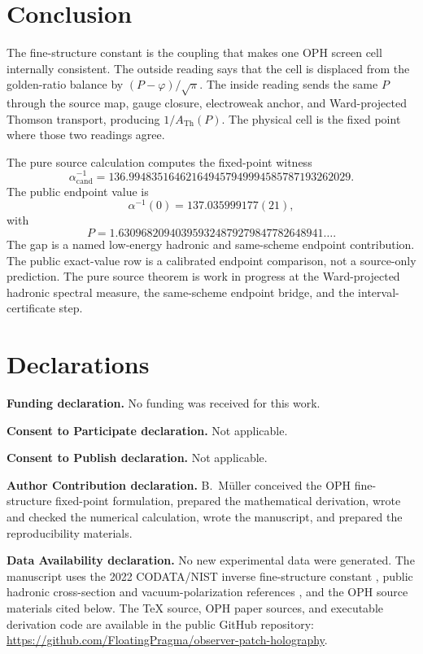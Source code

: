 \documentclass[11pt]{article}
\theoremstyle{remark}
\newcommand{\alphainv}{\alpha^{-1}}
\newcommand{\ATh}{A_{\mathrm{Th}}}
\begin{document}
\section{Conclusion}

The fine-structure constant is the coupling that makes one OPH screen cell internally consistent. The outside reading says that the cell is displaced from the golden-ratio balance by \((P-\varphi)/\sqrt\pi\). The inside reading sends the same \(P\) through the source map, gauge closure, electroweak anchor, and Ward-projected Thomson transport, producing \(1/\ATh(P)\). The physical cell is the fixed point where those two readings agree.

The pure source calculation computes the fixed-point witness
\[
\alphainv_{\mathrm{cand}}=136.994835164621649457949994585787193262029.
\]
The public endpoint value is
\[
\alphainv(0)=137.035999177(21),
\]
with
\[
P=1.630968209403959324879279847782648941\ldots.
\]
The gap is a named low-energy hadronic and same-scheme endpoint contribution. The public exact-value row is a calibrated endpoint comparison, not a source-only prediction. The pure source theorem is work in progress at the Ward-projected hadronic spectral measure, the same-scheme endpoint bridge, and the interval-certificate step.

\section*{Declarations}

\textbf{Funding declaration.} No funding was received for this work.

\textbf{Consent to Participate declaration.} Not applicable.

\textbf{Consent to Publish declaration.} Not applicable.

\textbf{Author Contribution declaration.} B.\ M\"uller conceived the OPH fine-structure fixed-point formulation, prepared the mathematical derivation, wrote and checked the numerical calculation, wrote the manuscript, and prepared the reproducibility materials.

\textbf{Data Availability declaration.} No new experimental data were generated. The manuscript uses the 2022 CODATA/NIST inverse fine-structure constant \cite{nist-value,nist-2022}, public hadronic cross-section and vacuum-polarization references \cite{pdg-xsect,dhmz,knt19}, and the OPH source materials cited below. The TeX source, OPH paper sources, and executable derivation code are available in the public GitHub repository:
\url{https://github.com/FloatingPragma/observer-patch-holography}.
\end{document}
